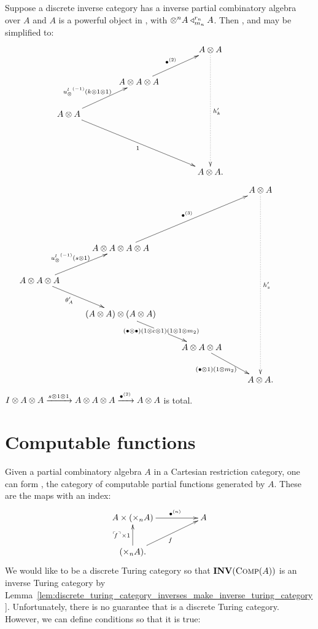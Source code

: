 \begin{lemma}\label{lem:powerful_inverse_partial_combinatory_algebra}
  Suppose a discrete inverse category \X has a inverse partial combinatory algebra over $A$ and $A$
  is  a powerful object in \X, with $\otimes^n A \triangleleft_{m_n}^{r_n} A$. Then ,
   and  may be simplified to:\\
    \[
      \xymatrix@C+15pt{
         && A\*A \ar@{.>}[dddd]^{h'_k}\\
        &A\* A\* A \ar[ur]^{\multibullet{2}} & & \\
        A\* A \ar[ur]^{\inv{\usl}(k\*1\*1)\ \ } \ar[ddrr]_{1} && &\\
         && & \\
        && A\*A. &
      }
    \]
    \[
      \xymatrix{
        &&& A\* A \ar@{.>}[dddddd]^{h'_s} \\
        & &  && \\
        &A\* A\* A\* A
          \ar[uurr]^{\multibullet{3}}\\
        A\* A\* A \ar[ur]^{\inv{\usl}(s\*1)\,} \ar[dr]_(.4){\theta_A'}\\
        &(A\* A) \* (A\* A) \ar[dr]|{(\bullet\*\bullet)(1\*c\*1)(1\*1\*m_2)} \\
        & &A\* A\* A\ar[dr]_{(\bullet\*1)(1\*m_2)\ }& &\\
        &&&A\*A. \\
      }
    \]
    $I\otimes A\otimes A \xrightarrow{s\otimes1\otimes1} A\otimes A\otimes A \xrightarrow{{\bullet}^{(2)}} A\otimes A$
   is total.
\end{lemma}

\section{Computable functions}
\label{sec:computable_functions}

Given a partial combinatory algebra $A$ in a Cartesian restriction category, one can form \compa,
the category of computable partial functions generated by $A$. These are the maps with an index:
\[
  \xymatrix@C+25pt{
    A\times (\times_n A) \ar[r]^(.6){\multibullet{n}} & A \\
    (\times_n A). \ar[u]^{\name{f}\times 1} \ar[ur]_f
  }
\]
We would like \compa to be a discrete Turing category so that $\mathbf{INV}({\textsc{Comp}(A)})$ is an inverse Turing
category by
Lemma~\ref{lem:discrete_turing_category_inverses_make_inverse_turing_category}. Unfortunately, there
is no guarantee that \compa is a discrete Turing category.  However, we can define conditions
so that it is true:


